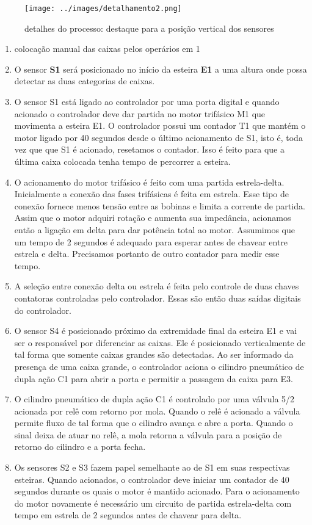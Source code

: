 \begin{figure}[H]
	\centering
	\texttt{[image: ../images/detalhamento2.png]}
	\caption{detalhes do processo: destaque para a posição vertical dos sensores}
	\label{fig:planta}
\end{figure}

\begin{enumerate}
	\item colocação manual das caixas pelos operários em 1
	\item  O sensor \textbf{S1} será posicionado no início da esteira \textbf{E1} a uma altura onde possa detectar as duas categorias de caixas.
	\item O sensor S1 está ligado ao controlador por uma porta digital e quando acionado o controlador deve dar partida no motor trifásico 
	M1	que movimenta a esteira E1. O controlador possui um contador T1 que mantém o motor ligado por 40 segundos desde o último acionamento de S1, isto é, toda vez que que S1 é acionado, resetamos o contador. Isso é feito para que a última caixa colocada tenha tempo 
	de percorrer a esteira.
	\item O acionamento do motor trifásico é feito com uma partida estrela-delta. Inicialmente a conexão das fases trifásicas é feita em
	estrela. Esse tipo de conexão fornece menos tensão entre as bobinas e limita a corrente de partida. Assim que o motor adquiri rotação
	e aumenta sua impedância, acionamos então a ligação em delta para dar potência total ao motor. Assumimos que um tempo de 2 segundos é adequado para esperar antes de chavear entre estrela e delta. Precisamos portanto de outro contador para medir esse tempo.
	\item A seleção entre conexão delta ou estrela é feita pelo controle de duas chaves contatoras controladas pelo controlador. Essas são então duas saídas digitais do controlador.
	\item  O sensor S4 é posicionado próximo da extremidade final da esteira E1 e vai ser o responsável por diferenciar as caixas. Ele é posicionado verticalmente de tal forma que somente caixas grandes são detectadas. Ao ser informado da presença de uma caixa grande, o controlador aciona o cilindro pneumático de dupla ação C1 para abrir a porta e permitir a passagem da caixa para E3.
	\item O cilindro pneumático de dupla ação C1 é controlado por uma válvula 5/2 acionada por relê com retorno por mola. Quando o relê é acionado a válvula permite fluxo de tal forma que o cilindro avança e abre a porta. Quando o sinal deixa de atuar no relê, a mola retorna a válvula para a posição de retorno do cilindro e a porta fecha. 
	\item Os sensores S2 e S3 fazem papel semelhante ao de S1 em suas respectivas esteiras. Quando acionados, o controlador deve iniciar
	um contador de 40 segundos durante os quais o motor é mantido acionado. Para o acionamento do motor novamente é necessário
	um circuito de partida estrela-delta com tempo em estrela de 2 segundos antes de chavear para delta. 
	
\end{enumerate}

